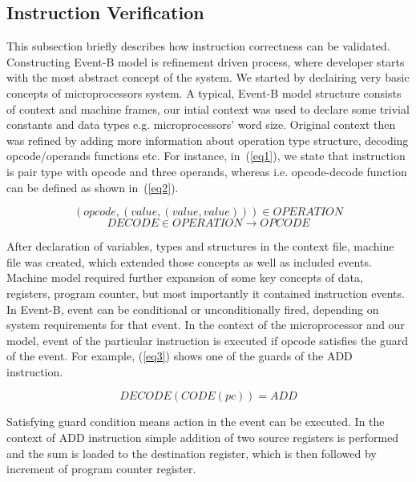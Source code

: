\documentclass[conference]{IEEEtran}
\begin{document}
\subsection{Instruction Verification}

This subsection briefly describes how instruction correctness can be validated. Constructing Event-B model
is refinement driven process, where developer starts with the most abstract concept of the system. We
started by declairing very basic concepts of microprocessors system. A typical, Event-B model structure
consists of context and machine frames, our intial context was used to declare some trivial constants and
data types e.g.  microprocessors' word size. Original context then was refined by adding more information
about operation type structure, decoding opcode/operands functions etc. For instance, in~(\ref{eq1}),
we state that instruction is pair type with opcode and three operands, whereas i.e. opcode-decode function
can be defined as shown in~(\ref{eq2}).

\begin{equation}
(opcode,(value, (value, value))) \in OPERATION
\label{eq1}
\end{equation}
\begin{equation}
DECODE \in OPERATION \rightarrow OPCODE
\label{eq2}
\end{equation}

After declaration of variables, types and structures in the context file, machine file was created, which
extended those concepts as well as included events. Machine model required further expansion of some key
concepts of data, registers, program counter, but most importantly it contained instruction events. In
Event-B, event can be conditional or unconditionally fired, depending on system requirements for that event.
In the context of the microprocessor and our model, event of the particular instruction is executed if
opcode satisfies the guard of the event. For example, (\ref{eq3}) shows one of the guards of the ADD
instruction.

\begin{equation}
DECODE(CODE(pc)) = ADD
\label{eq3}
\end{equation}

Satisfying guard condition means action in the event can be executed. In the context of ADD instruction
simple addition of two source registers is performed and the sum is loaded to the destination register,
which is then followed by increment of program counter register. 
\end{document}
